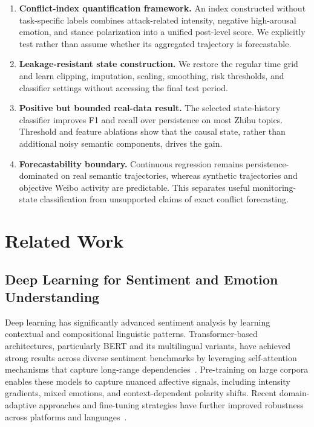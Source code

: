\documentclass[11pt,a4paper]{article}
\begin{document}
\begin{enumerate}[leftmargin=*,itemsep=2pt]
\item \textbf{Conflict-index quantification framework.} An index constructed without task-specific labels combines attack-related intensity, negative high-arousal emotion, and stance polarization into a unified post-level score. We explicitly test rather than assume whether its aggregated trajectory is forecastable.

\item \textbf{Leakage-resistant state construction.} We restore the regular time grid and learn clipping, imputation, scaling, smoothing, risk thresholds, and classifier settings without accessing the final test period.

\item \textbf{Positive but bounded real-data result.} The selected state-history classifier improves F1 and recall over persistence on most Zhihu topics. Threshold and feature ablations show that the causal state, rather than additional noisy semantic components, drives the gain.

\item \textbf{Forecastability boundary.} Continuous regression remains persistence-dominated on real semantic trajectories, whereas synthetic trajectories and objective Weibo activity are predictable. This separates useful monitoring-state classification from unsupported claims of exact conflict forecasting.
\end{enumerate}

\section{Related Work}

\subsection{Deep Learning for Sentiment and Emotion Understanding}

Deep learning has significantly advanced sentiment analysis by learning contextual and compositional linguistic patterns. Transformer-based architectures, particularly BERT and its multilingual variants, have achieved strong results across diverse sentiment benchmarks by leveraging self-attention mechanisms that capture long-range dependencies~\cite{bert-multilingual-sentiment}. Pre-training on large corpora enables these models to capture nuanced affective signals, including intensity gradients, mixed emotions, and context-dependent polarity shifts. Recent domain-adaptive approaches and fine-tuning strategies have further improved robustness across platforms and languages~\cite{wahid2025crisis,birjali2021sentiment}.
\end{document}
